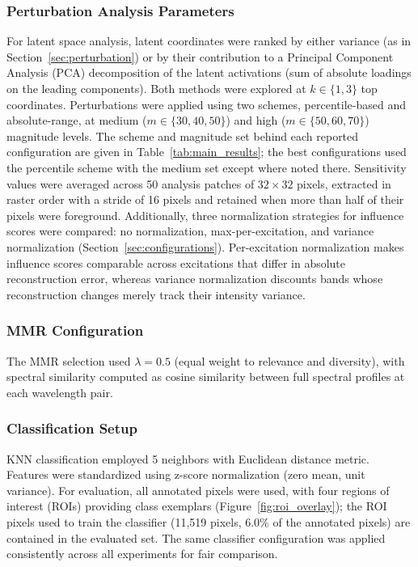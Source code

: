 \subsubsection{Perturbation Analysis Parameters}
For latent space analysis, latent coordinates were ranked by either variance (as in Section~\ref{sec:perturbation}) or by their contribution to a Principal Component Analysis (PCA) decomposition of the latent activations (sum of absolute loadings on the leading components).
Both methods were explored at $k \in \{1, 3\}$ top coordinates. Perturbations were applied using two schemes, percentile-based and absolute-range, at medium ($m \in \{30, 40, 50\}$) and high ($m \in \{50, 60, 70\}$) magnitude levels.
The scheme and magnitude set behind each reported configuration are given in Table~\ref{tab:main_results}; the best configurations used the percentile scheme with the medium set except where noted there.
Sensitivity values were averaged across 50 analysis patches of $32 \times 32$ pixels, extracted in raster order with a stride of 16 pixels and retained when more than half of their pixels were foreground.
Additionally, three normalization strategies for influence scores were compared: no normalization, max-per-excitation, and variance normalization (Section~\ref{sec:configurations}).
Per-excitation normalization makes influence scores comparable across excitations that differ in absolute reconstruction error, whereas variance normalization discounts bands whose reconstruction changes merely track their intensity variance.

\subsubsection{MMR Configuration}
The MMR selection used $\lambda = 0.5$ (equal weight to relevance and diversity), with spectral similarity computed as cosine similarity between full spectral profiles at each wavelength pair.

\subsubsection{Classification Setup}
KNN classification employed 5 neighbors with Euclidean distance metric.
Features were standardized using z-score normalization (zero mean, unit variance).
For evaluation, all annotated pixels were used, with four regions of interest (ROIs) providing class exemplars (Figure~\ref{fig:roi_overlay}); the ROI pixels used to train the classifier (11,519 pixels, 6.0\% of the annotated pixels) are contained in the evaluated set. The same classifier configuration was applied consistently across all experiments for fair comparison.

